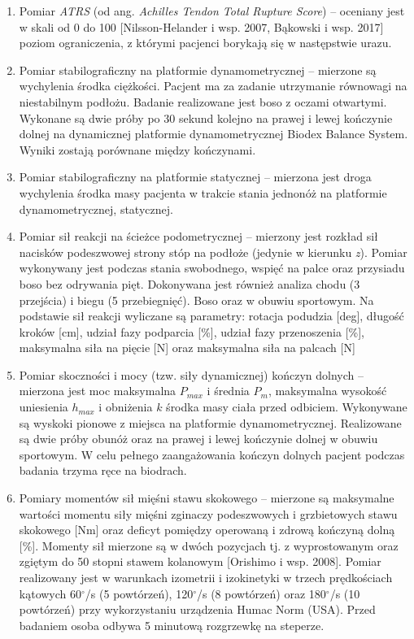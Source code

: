 \begin{enumerate}
	\item Pomiar \textit{ATRS} (od ang. \textit{Achilles Tendon Total Rupture Score}) -- oceniany jest w skali od 0 do 100 [Nilsson-Helander i wsp. 2007, Bąkowski i wsp. 2017] poziom ograniczenia, z którymi pacjenci borykają się w następstwie urazu.
	\item Pomiar stabilograficzny na platformie dynamometrycznej -- mierzone są wychylenia środka ciężkości. Pacjent ma za zadanie utrzymanie równowagi na niestabilnym podłożu. Badanie realizowane jest boso z oczami otwartymi. Wykonane są dwie próby po 30 sekund kolejno na prawej i lewej kończynie dolnej na dynamicznej platformie dynamometrycznej Biodex Balance System. Wyniki zostają porównane między kończynami. 
	\item Pomiar stabilograficzny na platformie statycznej -- mierzona jest droga wychylenia środka masy pacjenta w trakcie stania jednonóż na platformie dynamometrycznej, statycznej.
	\item Pomiar sił reakcji na ścieżce podometrycznej -- mierzony jest rozkład sił nacisków podeszwowej strony stóp na podłoże (jedynie w kierunku \textit{z}). Pomiar wykonywany jest podczas stania swobodnego, wspięć na palce oraz przysiadu boso bez odrywania pięt. Dokonywana jest również analiza chodu (3 przejścia) i biegu (5 przebiegnięć). Boso oraz w obuwiu sportowym. Na podstawie sił reakcji wyliczane są parametry: rotacja podudzia [deg], długość kroków [cm], udział fazy podparcia [\%], udział fazy przenoszenia [\%], maksymalna siła na pięcie [N] oraz maksymalna siła na palcach [N]
	\item Pomiar skoczności i mocy (tzw. siły dynamicznej) kończyn dolnych -- mierzona jest moc maksymalna $P_{max}$ i średnia $P_m$, maksymalna wysokość uniesienia $h_{max}$ i obniżenia $k$ środka masy ciała przed odbiciem. Wykonywane są wyskoki pionowe z miejsca na platformie dynamometrycznej. Realizowane są dwie próby obunóż oraz na prawej i lewej kończynie dolnej w obuwiu sportowym. W celu pełnego zaangażowania kończyn dolnych pacjent podczas badania trzyma ręce na biodrach. 
	\item Pomiary momentów sił mięśni stawu skokowego -- mierzone są maksymalne wartości momentu siły mięśni zginaczy podeszwowych i grzbietowych stawu skokowego [Nm] oraz deficyt pomiędzy operowaną i zdrową kończyną dolną [\%]. Momenty sił mierzone są w dwóch pozycjach tj. z wyprostowanym oraz zgiętym do 50 stopni stawem kolanowym [Orishimo i wsp. 2008]. Pomiar realizowany jest w warunkach izometrii i izokinetyki w trzech prędkościach kątowych 60$^\circ$/s (5 powtórzeń), 120$^\circ$/s (8 powtórzeń) oraz 180$^\circ$/s (10 powtórzeń) przy wykorzystaniu urządzenia Humac Norm (USA). Przed badaniem osoba odbywa 5 minutową rozgrzewkę na steperze.
\end{enumerate}

